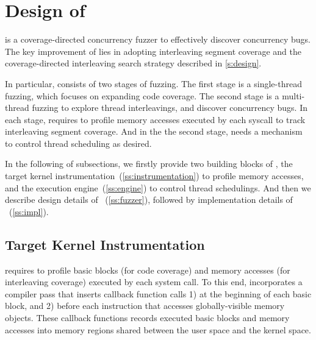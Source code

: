 \section{Design of \sys}
\label{s:impl}

\sys is a coverage-directed concurrency fuzzer to effectively discover
concurrency bugs.
%
The key improvement of \sys lies in adopting interleaving segment
coverage and the coverage-directed interleaving search strategy
described in \autoref{s:design}.
%

In particular, \sys consists of two stages of fuzzing.
%
The first stage is a single-thread fuzzing, which focuses on expanding
code coverage\dr{}.
%
The second stage is a multi-thread fuzzing to explore thread
interleavings, and discover concurrency bugs.
%
In each stage, \sys requires to profile memory accesses executed by
each syscall to track interleaving segment coverage.
%
And in the the second stage, \sys needs a mechanism to control thread
scheduling as desired.



In the following of subsections, we firstly provide two building
blocks of \sys, the target kernel
instrumentation~(\autoref{ss:instrumentation}) to profile memory
accesses, and the execution engine~(\autoref{ss:engine}) to control
thread schedulings.
%
And then we describe design details of \sys~(\autoref{ss:fuzzer}),
followed by implementation details of \sys~(\autoref{ss:impl}).


\subsection{Target Kernel Instrumentation}
\label{ss:instrumentation}

\sys requires to profile basic blocks (for code coverage) and memory
accesses (for interleaving coverage) executed by each system call.
%
To this end, \sys incorporates a compiler pass that inserts callback
function calls 1) at the beginning of each basic block, and 2) before
each instruction that accesses globally-visible memory objects.
%
These callback functions records executed basic blocks and memory
accesses into memory regions shared between the user space and the
kernel space.



